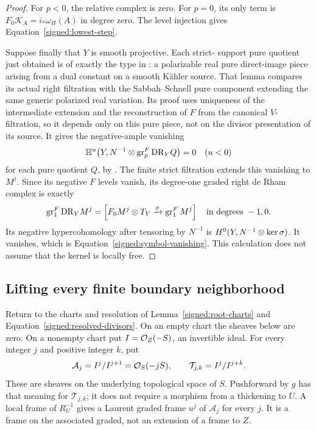 \begin{proof}
For \(p<0\), the relative complex is zero.  For \(p=0\), its
only term is \(F_0\mathcal K_A=i_*\omega_H(A)\) in degree
zero.  The level injection gives
Equation~\eqref{signed:lowest-step}.

Suppose finally that \(Y\) is smooth projective.  Each strict-
support pure quotient just obtained is of exactly the type in
\cite[Lemma~11.2]{BL}: a polarizable real pure direct-image
piece arising from a dual constant on a smooth Kähler source.
That lemma compares its actual right filtration with the
Sabbah--Schnell pure component extending the same generic
polarized real variation.  Its proof uses uniqueness of the
intermediate extension and the reconstruction of \(F\) from
the canonical \(V\)-filtration, so it depends only on this
pure piece, not on the divisor presentation of its source.
It gives the negative-ample vanishing
\[
 \mathbb H^u\bigl(Y,N^{-1}\otimes\operatorname{gr}^F_p\mathrm{DR}_Y Q\bigr)=0
 \quad(u<0)
\]
for each pure quotient \(Q\), by
\cite[Theorem~16.3.10]{SabbahSchnell}.  The finite strict
filtration extends this vanishing to \(M^j\).  Since its
negative \(F\) levels vanish, its degree-one graded right
de Rham complex is exactly
\[
 \operatorname{gr}^F_1\mathrm{DR}_Y M^j=
 \left[F_0M^j\otimes T_Y\xrightarrow{\sigma}\operatorname{gr}^F_1M^j\right]
 \quad\text{in degrees }-1,0.
\]
Its negative hypercohomology after tensoring by \(N^{-1}\)
is \(H^0(Y,N^{-1}\otimes\operatorname{ker}\sigma)\).  It vanishes, which
is Equation~\eqref{signed:symbol-vanishing}.  This calculation
does not assume that the kernel is locally free.
\end{proof}

\subsection{Lifting every finite boundary neighborhood}

Return to the charts and resolution of
Lemma~\ref{signed:root-charts} and
Equation~\eqref{signed:resolved-divisors}.  On an empty chart the sheaves
below are zero.  On a nonempty chart put \(I=\mathcal O_Z(-S)\), an invertible
ideal.  For every integer \(j\)
and positive integer \(k\), put
\[
 \mathcal A_j=I^j/I^{j+1}=\mathcal O_S(-jS),\qquad
 \mathcal T_{j,k}=I^j/I^{j+k}.
\]
These are sheaves on the underlying topological space of \(S\).
Pushforward by \(g\) has that meaning for \(\mathcal T_{j,k}\);
it does not require a morphism from a thickening to \(U\).
A local frame of \(R_U^{-1}\) gives a Laurent graded frame
\(u^j\) of \(\mathcal A_j\) for every \(j\).  It is a frame
on the associated graded, not an extension of a frame to \(Z\).


